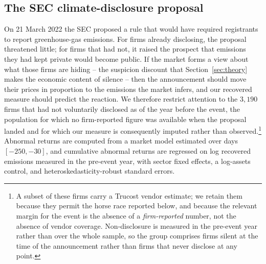 \documentclass[a4paper,12pt]{article}
\begin{document}
\subsection{The SEC climate-disclosure proposal}
\label{subsec:sec_event}

On 21 March 2022 the SEC proposed a rule that would have required registrants to report greenhouse-gas emissions. For firms already disclosing, the proposal threatened little; for firms that had not, it raised the prospect that emissions they had kept private would become public. If the market forms a view about what those firms are hiding -- the suspicion discount that Section~\ref{sec:theory} makes the economic content of silence -- then the announcement should move their prices in proportion to the emissions the market infers, and our recovered measure should predict the reaction. We therefore restrict attention to the $3{,}190$ firms that had not voluntarily disclosed as of the year before the event, the population for which no firm-reported figure was available when the proposal landed and for which our measure is consequently imputed rather than observed.\footnote{A subset of these firms carry a Trucost vendor estimate; we retain them because they permit the horse race reported below, and because the relevant margin for the event is the absence of a \emph{firm-reported} number, not the absence of vendor coverage. Non-disclosure is measured in the pre-event year rather than over the whole sample, so the group comprises firms silent at the time of the announcement rather than firms that never disclose at any point.} Abnormal returns are computed from a market model estimated over days $[-250,-30]$, and cumulative abnormal returns are regressed on log recovered emissions measured in the pre-event year, with sector fixed effects, a log-assets control, and heteroskedasticity-robust standard errors.
\end{document}
